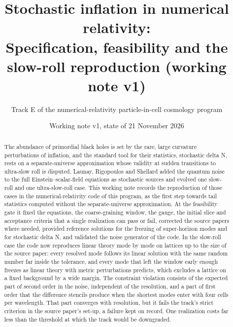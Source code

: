 \documentclass[aps,prd,twocolumn,10pt,superscriptaddress,nofootinbib,longbibliography,floatfix]{revtex4-2}
\begin{document}
\raggedbottom

\title{Stochastic inflation in numerical relativity:\\ Specification, feasibility and the slow-roll reproduction (working note v1)}

\author{Track E of the numerical-relativity particle-in-cell cosmology program}

\date{Working note v1, state of 21 November 2026}

\begin{abstract}
The abundance of primordial black holes is set by the rare, large curvature perturbations of inflation, and the standard tool for their statistics, stochastic delta N, rests on a separate-universe approximation whose validity at sudden transitions to ultra-slow roll is disputed. Launay, Rigopoulos and Shellard added the quantum noise to the full Einstein--scalar-field equations as stochastic sources and evolved one slow-roll and one ultra-slow-roll case. This working note records the reproduction of those cases in the numerical-relativity code of this program, as the first step towards tail statistics computed without the separate-universe approximation. At the feasibility gate it fixed the equations, the coarse-graining window, the gauge, the initial slice and acceptance criteria that a single realization can pass or fail, corrected the source papers where needed, provided reference solutions for the freezing of super-horizon modes and for stochastic delta N, and validated the noise generator of the code. In the slow-roll case the code now reproduces linear theory mode by mode on lattices up to the size of the source paper: every resolved mode follows its linear solution with the same random number far inside the tolerance, and every mode that left the window early enough freezes as linear theory with metric perturbations predicts, which excludes a lattice on a fixed background by a wide margin. The constraint violation consists of the expected part of second order in the noise, independent of the resolution, and a part of first order that the difference stencils produce when the shortest modes enter with four cells per wavelength. That part converges with resolution, but it fails the track's strict criterion in the source paper's set-up, a failure kept on record. One realization costs far less than the threshold at which the track would be downgraded.
\end{abstract}

\maketitle
\end{document}
